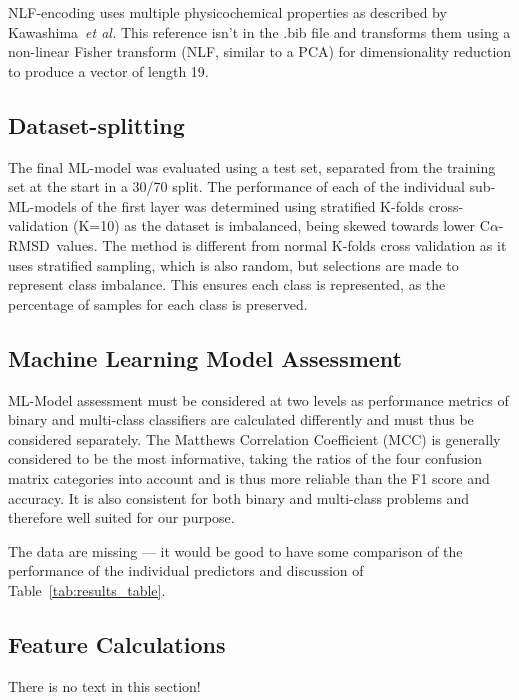 \documentclass[12pt]{article}
\newcommand{\carmsd}{\mbox{C$\alpha$-RMSD}}
\newcommand{\etal}{~\emph{et al.}}
\newcommand{\lilian}[1]{ {\color{red}{\bfseries Lilian:} #1}}
\let\shortcite\cite
\begin{document}
NLF-encoding \shortcite{Nanni2011} uses multiple physicochemical
properties as described by Kawashima\etal\shortcite{Kawashima2000}
\lilian{This reference isn't in the .bib file} and
transforms them using a non-linear Fisher transform (NLF, similar to a
PCA) for dimensionality reduction to produce a vector of length 19.


\subsection{Dataset-splitting}
The final ML-model was evaluated using a test set, separated from the
training set at the start in a 30/70 split. The performance of each of the individual sub-ML-models of the first layer was determined using stratified K-folds cross-validation (K=10) as the
dataset is imbalanced, being skewed towards lower \carmsd\ values\cite{Krstajic2014,Kohavi1995}. The
method is different from normal K-folds cross validation as it uses
stratified sampling, which is also random, but selections are made to represent class imbalance.
This ensures each class is represented, as the percentage of samples for each class is
preserved.

\subsection{Machine Learning Model Assessment} 
ML-Model assessment must be considered at two levels as performance
metrics of binary and multi-class classifiers are calculated
differently and must thus be considered separately. The Matthews
Correlation Coefficient (MCC)\cite{Chicco2020} is generally considered to be the most
informative, taking the ratios of the four confusion matrix categories
into account and is thus more reliable than the F1 score and
accuracy. It is also consistent for both binary and multi-class
problems and therefore well suited for our purpose\cite{Jurman2012}.

\lilian{The data are missing --- it would be good to have some
  comparison of the performance of the individual predictors and
  discussion of Table~\ref{tab:results_table}.}

\subsection{Feature Calculations}

\lilian{There is no text in this section!}
\end{document}
